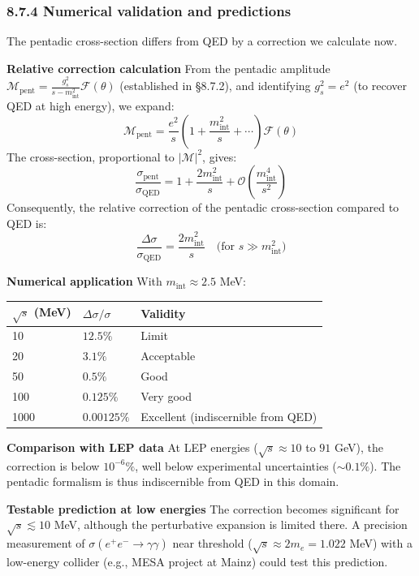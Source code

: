 \documentclass[11pt]{article}
\let\oldmathcal\mathcal
\renewcommand{\mathcal}[1]{\oldmathcal{#1}}
\begin{document}
\hypertarget{numerical-validation-and-predictions}{%
\subsubsection{8.7.4 Numerical validation and
predictions}\label{numerical-validation-and-predictions}}

The pentadic cross-section differs from QED by a correction we calculate
now.

\textbf{Relative correction calculation} From the pentadic amplitude
\(\mathcal{M}_{\text{pent}} = \frac{g_s^2}{s - m_{\text{int}}^2} \mathcal{F}(\theta)\)
(established in §8.7.2), and identifying \(g_s^2 = e^2\) (to recover QED
at high energy), we expand: \[
\mathcal{M}_{\text{pent}} = \frac{e^2}{s} \left(1 + \frac{m_{\text{int}}^2}{s} + \cdots \right) \mathcal{F}(\theta)
\] The cross-section, proportional to \(|\mathcal{M}|^2\), gives: \[
\frac{\sigma_{\text{pent}}}{\sigma_{\text{QED}}} = 1 + \frac{2m_{\text{int}}^2}{s} + \mathcal{O}\left(\frac{m_{\text{int}}^4}{s^2}\right)
\] Consequently, the relative correction of the pentadic cross-section
compared to QED is: \[
\frac{\Delta\sigma}{\sigma_{\text{QED}}} = \frac{2m_{\text{int}}^2}{s} \quad \text{(for } s \gg m_{\text{int}}^2\text{)}
\]

\textbf{Numerical application} With \(m_{\text{int}} \approx 2.5\) MeV:

\begin{table}[H]
\centering
\begin{tabular}{@{}lll@{}}
\toprule
$\sqrt{s}$ (MeV) & $\Delta\sigma/\sigma$ & Validity \\
\midrule
10 & $12.5\%$ & Limit \\
20 & $3.1\%$ & Acceptable \\
50 & $0.5\%$ & Good \\
100 & $0.125\%$ & Very good \\
1000 & $0.00125\%$ & Excellent (indiscernible from QED) \\
\bottomrule
\end{tabular}
\end{table}

\textbf{Comparison with LEP data} At LEP energies
(\(\sqrt{s} \approx 10\) to \(91\) GeV), the correction is below
\(10^{-6}\%\), well below experimental uncertainties (\(\sim 0.1\%\)).
The pentadic formalism is thus indiscernible from QED in this domain.

\textbf{Testable prediction at low energies} The correction becomes
significant for \(\sqrt{s} \lesssim 10\) MeV, although the perturbative
expansion is limited there. A precision measurement of
\(\sigma(e^+e^- \to \gamma\gamma)\) near threshold
(\(\sqrt{s} \approx 2m_e = 1.022\) MeV) with a low-energy collider
(e.g., MESA project at Mainz) could test this prediction.
\end{document}
